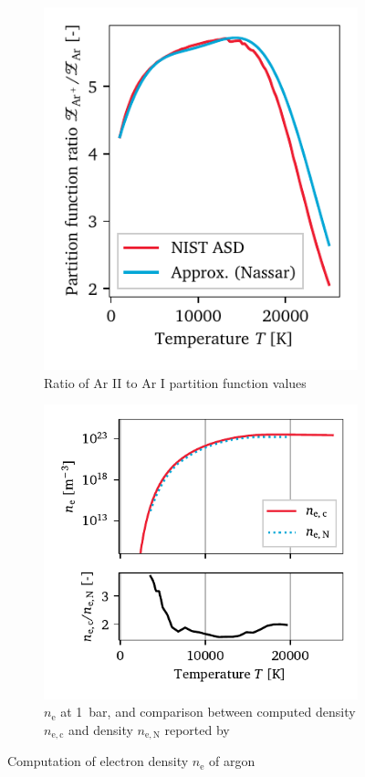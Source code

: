         \begin{figure}[h]
            \centering
            \begin{subfigure}[t]{2.6in}
                \centering
                \includegraphics[]{assets/4 models/partition}
                \caption{Ratio of Ar II to Ar I partition function values}
                \label{fig:e_density_partition}
            \end{subfigure}
            \hfill
            \begin{subfigure}[t]{3.2in}
                \centering
                \includegraphics[]{assets/4 models/n_e}
                \caption{$n_\mathrm{e}$ at \qty{1}{bar}, and comparison between computed density $n_\mathrm{e, c}$ and density $n_\mathrm{e, N}$ reported by \textcite{nassarInvestigationLasersustainedPlasma2012}}
                \label{fig:e_density_curves}
            \end{subfigure}
            \caption{Computation of electron density $n_\mathrm{e}$ of argon}
            \label{fig:e_density}
        \end{figure}

